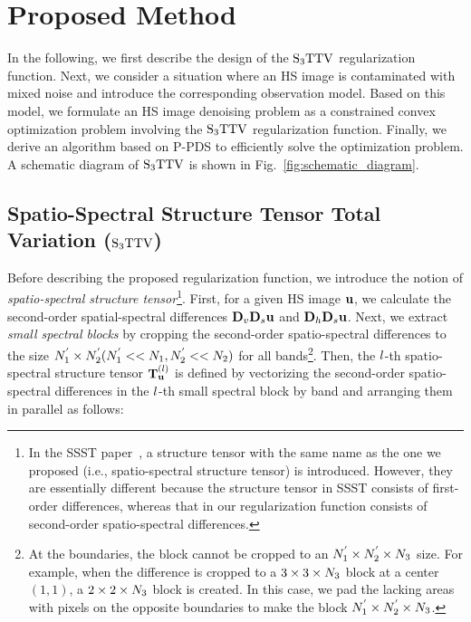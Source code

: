 \section{Proposed Method}
\label{sec:proposed_method}

In the following, we first describe the design of the ${\text{S}_{3} \text{TTV}}$ regularization function. Next, we consider a situation where an HS image is contaminated with mixed noise and introduce the corresponding observation model. Based on this model, we formulate an HS image denoising problem as a constrained convex optimization problem involving the ${\text{S}_{3} \text{TTV}}$ regularization function. Finally, we derive an algorithm based on P-PDS to efficiently solve the optimization problem. A schematic diagram of ${\text{S}_{3} \text{TTV}}$ is shown in Fig.~\ref{fig:schematic_diagram}.

\subsection{Spatio-Spectral Structure Tensor Total Variation (${\text{S}_{3} \text{TTV}}$)}
\label{subsec:S3TTV}
Before describing the proposed regularization function, we introduce the notion of \textit{spatio-spectral structure tensor}\footnote{In the SSST paper~\cite{Kurihara2017SSST}, a structure tensor with the same name as the one we proposed (i.e., spatio-spectral structure tensor) is introduced. However, they are essentially different because the structure tensor in SSST consists of first-order differences, whereas that in our regularization function consists of second-order spatio-spectral differences.}.
First, for a given HS image $\mathbf{u}$, we calculate the second-order spatial-spectral differences $\mathbf{D}_{v} \mathbf{D}_{s} \mathbf{u}$ and $\mathbf{D}_{h} \mathbf{D}_{s} \mathbf{u}$.
Next, we extract \textit{small spectral blocks} by cropping the second-order spatio-spectral differences to the size $N_{1}^{'} \times N_{2}^{'} (N_{1}^{'} << N_{1}, N_{2}^{'} << N_{2})$ for all bands\footnote{At the boundaries, the block cannot be cropped to an $N_{1}^{'} \times N_{2}^{'} \times N_{3}$ size. For example, when the difference is cropped to a $3 \times 3 \times N_{3}$ block at a center $(1, 1)$, a $2 \times 2 \times N_{3}$ block is created. In this case, we pad the lacking areas with pixels on the opposite boundaries to make the block $N_{1}^{'} \times N_{2}^{'} \times N_{3}$.}. Then, the $l$-th spatio-spectral structure tensor $\mathbf{T}_{\mathbf{u}}^{(l)}$ is defined by vectorizing the second-order spatio-spectral differences in the $l$-th small spectral block by band and arranging them in parallel as follows:
